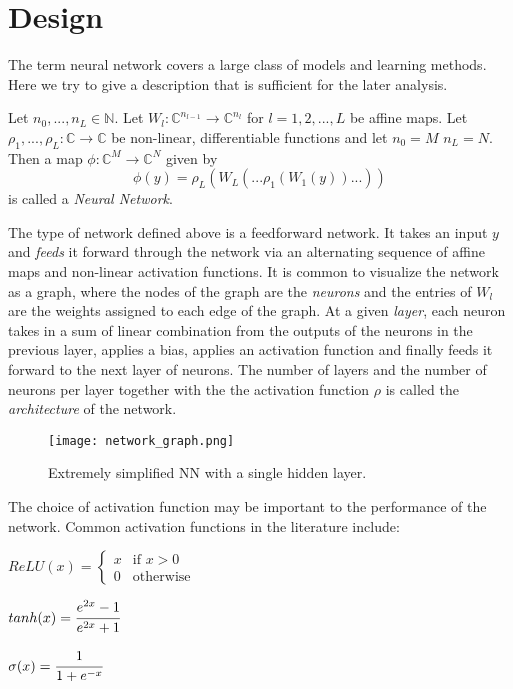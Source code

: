 \section{Design}
The term neural network covers a large class of models and learning methods. Here we try to give a description that is sufficient for the later analysis.

\begin{definition}
Let $n_0,...,n_L \in \mathbb{N}$. Let $W_l : \mathbb{C}^{n_{l-1}} \rightarrow \mathbb{C}^{n_l}$ for $l = 1,2,...,L$ be affine maps. Let $\rho_1,...,\rho_L : \mathbb{C}\rightarrow  \mathbb{C}$ be non-linear, differentiable functions and let $n_0=M$  $n_L=N$. Then a map $\phi : \mathbb{C}^{M}\rightarrow  \mathbb{C}^{N}$ given by
\begin{equation*}
\phi(y) = \rho_{L}(W_{L}(...\rho_{1}(W_{1}(y))...))
\end{equation*}
is called a \emph{Neural Network}.
\end{definition}

The type of network defined above is a feedforward network. It takes an input $y$ and \emph{feeds} it forward through the network via an alternating sequence of affine maps and non-linear activation functions. It is common to visualize the network as a graph, where the nodes of the graph are the \emph{neurons} and the entries of $W_l$ are the weights assigned to each edge of the graph. At a given \emph{layer}, each neuron takes in a sum of linear combination from the outputs of the neurons in the previous layer, applies a bias, applies an activation function and finally feeds it forward to the next layer of neurons.  
The number of layers and the number of neurons per layer together with the the activation function $\rho$ is called the \emph{architecture} of the network. 

\begin{figure}
\centerline{\texttt{[image: network\_graph.png]}}
\caption{Extremely simplified NN with a single hidden layer.}
\end{figure}


The choice of activation function may be important to the performance of the network. Common activation functions in the literature include: 

\begin{center}
\begin{math}
  ReLU(x)=\begin{cases}
    x & \text{if $x>0$}\\
    0 & \text{otherwise}
  \end{cases} 
\end{math}

\begin{math}
  tanh(x)=\cfrac{e^{2x}-1}{e^{2x}+1}
\end{math}

\begin{math}
   \sigma(x)=\cfrac{1}{1+e^{-x}}
\end{math}
\end{center}

